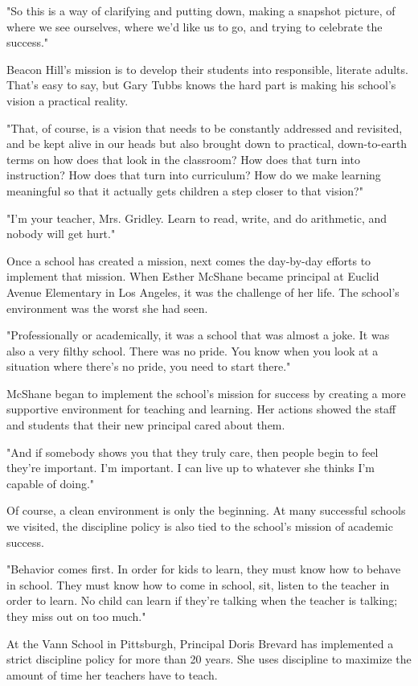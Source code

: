 "So this is a way of clarifying and putting down, making a snapshot picture, of where we see ourselves, where we'd like us to go, and trying to celebrate the success."

Beacon Hill's mission is to develop their students into responsible, literate adults. That's easy to say, but Gary Tubbs knows the hard part is making his school's vision a practical reality.

"That, of course, is a vision that needs to be constantly addressed and revisited, and be kept alive in our heads but also brought down to practical, down-to-earth terms on how does that look in the classroom? How does that turn into instruction? How does that turn into curriculum? How do we make learning meaningful so that it actually gets children a step closer to that vision?"

"I'm your teacher, Mrs. Gridley. Learn to read, write, and do arithmetic, and nobody will get hurt."

Once a school has created a mission, next comes the day-by-day efforts to implement that mission. When Esther McShane became principal at Euclid Avenue Elementary in Los Angeles, it was the challenge of her life. The school's environment was the worst she had seen.

"Professionally or academically, it was a school that was almost a joke. It was also a very filthy school. There was no pride. You know when you look at a situation where there's no pride, you need to start there."

McShane began to implement the school's mission for success by creating a more supportive environment for teaching and learning. Her actions showed the staff and students that their new principal cared about them.

"And if somebody shows you that they truly care, then people begin to feel they're important. I'm important. I can live up to whatever she thinks I'm capable of doing."

Of course, a clean environment is only the beginning. At many successful schools we visited, the discipline policy is also tied to the school's mission of academic success.

"Behavior comes first. In order for kids to learn, they must know how to behave in school. They must know how to come in school, sit, listen to the teacher in order to learn. No child can learn if they're talking when the teacher is talking; they miss out on too much."

At the Vann School in Pittsburgh, Principal Doris Brevard has implemented a strict discipline policy for more than 20 years. She uses discipline to maximize the amount of time her teachers have to teach.

